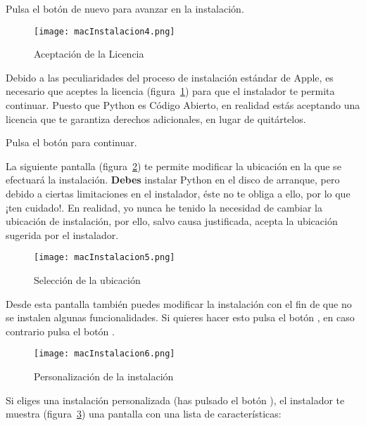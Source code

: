 Pulsa el botón  de nuevo para avanzar en la instalación.

\begin{figure}[!h]
  \begin{center}
\texttt{[image: macInstalacion4.png]}
\caption{Aceptación de la Licencia}\label{figm04}
  \end{center}
\end{figure}

Debido a las peculiaridades del proceso de instalación estándar de Apple, es necesario que aceptes la licencia (figura~\ref{figm04}) para que el instalador te permita continuar. Puesto que Python es Código Abierto, en realidad estás aceptando una licencia que te garantiza derechos adicionales, en lugar de quitártelos.

Pulsa el botón  para continuar.

La siguiente pantalla (figura~\ref{figm05}) te permite modificar la ubicación en la que se efectuará la instalación. \textbf{Debes} instalar Python en el disco de arranque, pero debido a ciertas limitaciones en el instalador, éste no te obliga a ello, por lo que ¡ten cuidado!. En realidad, yo nunca he tenido la necesidad de cambiar la ubicación de instalación, por ello, salvo causa justificada, acepta la ubicación sugerida por el instalador.

\begin{figure}[!h]
  \begin{center}
\texttt{[image: macInstalacion5.png]}
\caption{Selección de la ubicación}\label{figm05}
  \end{center}
\end{figure}

Desde esta pantalla también puedes modificar la instalación con el fin de que no se instalen algunas funcionalidades. Si quieres hacer esto pulsa el botón , en caso contrario pulsa el botón .

\begin{figure}[!h]
  \begin{center}
\texttt{[image: macInstalacion6.png]}
\caption{Personalización de la instalación}\label{figm06}
  \end{center}
\end{figure}

Si eliges una instalación personalizada (has pulsado el botón ), el instalador te muestra (figura~\ref{figm06}) una pantalla con una lista de características:

